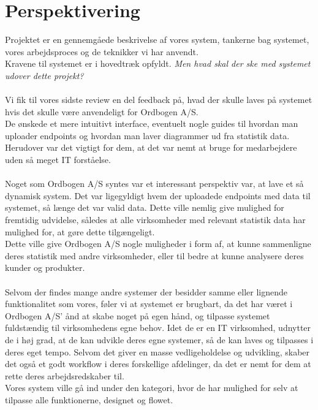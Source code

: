 \section{Perspektivering}
Projektet er en gennemgåede beskrivelse af vores system, tankerne bag systemet, vores arbejdsproces og de teknikker vi har anvendt.
\\
Kravene til systemet er i hovedtræk opfyldt. \textit{Men hvad skal der ske med systemet udover dette projekt?}
\\\\
Vi fik til vores sidste review en del feedback på, hvad der skulle laves på systemet hvis det skulle være anvendeligt for Ordbogen A/S.
\\
De ønskede et mere intuitivt interface, eventuelt nogle guides til hvordan man uploader endpoints og hvordan man laver diagrammer ud fra statistik data.
Herudover var det vigtigt for dem, at det var nemt at bruge for medarbejdere uden så meget IT forståelse.
\\\\
Noget som Ordbogen A/S syntes var et interessant perspektiv var, at lave et så dynamisk system. Det var ligegyldigt hvem der uploadede endpoints med data til systemet,
så længe det var valid data. Dette ville nemlig give mulighed for fremtidig udvidelse, således at alle virksomheder med relevant statistik data har mulighed for, at gøre dette tilgængeligt.
\\
Dette ville give Ordbogen A/S nogle muligheder i form af, at kunne sammenligne deres statistik med andre virksomheder, eller til bedre at kunne analysere deres kunder og produkter.
\\\\
Selvom der findes mange andre systemer der besidder samme eller lignende funktionalitet som vores, føler vi at systemet er brugbart,
da det har været i Ordbogen A/S' ånd at skabe noget på egen hånd, og tilpasse systemet fuldstændig til virksomhedens egne behov.
Idet de er en IT virksomhed, udnytter de i høj grad, at de kan udvikle deres egne systemer, så de kan laves og tilpasses i deres eget tempo.
Selvom det giver en masse vedligeholdelse og udvikling, skaber det også et godt workflow i deres forskellige afdelinger, da det er nemt for dem at rette deres arbejdsredskaber til.
\\
Vores system ville gå ind under den kategori, hvor de har mulighed for selv at tilpasse alle funktionerne, designet og flowet.
